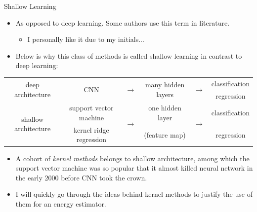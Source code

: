 \documentclass[aspectratio=169]{beamer}
\begin{document}
\begin{frame}{Shallow Learning}
  \begin{itemize}
    \item As opposed to deep learning. Some authors use this term in literature.
    \begin{itemize}
      \item I personally like it due to my initials...
    \end{itemize}
    \item Below is why this class of methods is called shallow learning in contrast to deep learning:    
  \end{itemize}
  \centering
  \scriptsize
  \begin{tabular}{c|ccccc}
    \multirow{2}{*}{deep architecture} & \multirow{2}{*}{CNN} & \multirow{2}{*}{$\longrightarrow$} & \multirow{2}{*}{many hidden layers} & \multirow{2}{*}{$\longrightarrow$} & classification    \\
    &&&&&regression\\
    \hline
    \multirow{2}{*}{shallow architecture} & support vector machine & \multirow{2}{*}{$\longrightarrow$} & one hidden layer & \multirow{2}{*}{$\longrightarrow$} & classification\\
    & kernel ridge regression & & (feature map) & & regression\\
  \end{tabular}
  \normalsize
  \begin{itemize}
    \item A cohort of \emph{kernel methods} belongs to shallow architecture, among which the support vector machine was so popular that it almost killed neural network in the early 2000 before CNN took the crown.
    \item I will quickly go through the ideas behind kernel methods to justify the use of them for an energy estimator.
  \end{itemize}
\end{frame}
\end{document}
